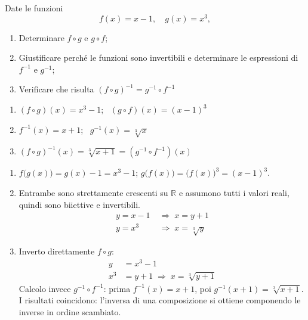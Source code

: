 \begin{question}[ID=6.1, subtitle={Composizione e inverse di $f(x)=x-1$ e $g(x)=x^3$}, difficulty=difficile, tags={funzioni,composte,inversa}]
Date le funzioni
\[
f(x)=x-1,\quad g(x)=x^3,
\]
\begin{enumerate}
    \item Determinare \(f \circ g\) e \(g \circ f\);
    \item Giustificare perché le funzioni sono invertibili e determinare le espressioni di \(f^{-1}\) e \(g^{-1}\);
    \item Verificare che risulta $(f \circ g)^{-1} = g^{-1} \circ f^{-1}$
\end{enumerate}
\begin{solution}
\begin{enumerate}
    \item $(f\circ g)(x)=x^3-1$; \ $(g\circ f)(x)=(x-1)^3$
    \item $f^{-1}(x)=x+1$; \ $g^{-1}(x)=\sqrt[3]{x}$
    \item $(f\circ g)^{-1}(x)=\sqrt[3]{x+1}=(g^{-1}\circ f^{-1})(x)$
\end{enumerate}
\end{solution}
\begin{explanation}
\begin{enumerate}
    \item $f\big(g(x)\big)=g(x)-1=x^3-1$; \quad $g\big(f(x)\big)=\big(f(x)\big)^3=(x-1)^3$.
    \item Entrambe sono strettamente crescenti su $\mathbb{R}$ e assumono tutti i valori reali, quindi sono biiettive e invertibili.
    \[\begin{aligned}
    y=x-1 &\;\Rightarrow\; x=y+1\\
    y=x^3 &\;\Rightarrow\; x=\sqrt[3]{y}
    \end{aligned}\]
    \item Inverto direttamente $f\circ g$:
    \[\begin{aligned}
    y &= x^3-1\\
    x^3 &= y+1 \;\Rightarrow\; x=\sqrt[3]{y+1}
    \end{aligned}\]
    Calcolo invece $g^{-1}\circ f^{-1}$: prima $f^{-1}(x)=x+1$, poi $g^{-1}(x+1)=\sqrt[3]{x+1}$. \\
    I risultati coincidono: l'inversa di una composizione si ottiene componendo le inverse in ordine scambiato.
\end{enumerate}
\end{explanation}
\end{question}

